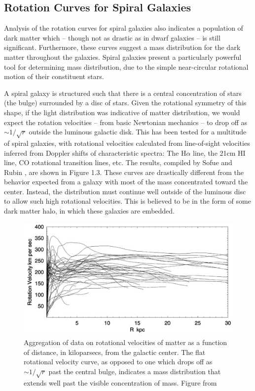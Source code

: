 \documentclass{report}
\begin{document}
\subsection{Rotation Curves for Spiral Galaxies}

Analysis of the rotation curves for spiral galaxies also indicates a population of dark matter which -- though not as drastic as in dwarf galaxies -- is still significant. Furthermore, these curves suggest a mass distribution for the dark matter throughout the galaxies. Spiral galaxies present a particularly powerful tool for determining mass distribution, due to the simple near-circular rotational motion of their constituent stars.

A spiral galaxy is structured such that there is a central concentration of stars (the bulge) surrounded by a disc of stars. Given the rotational symmetry of this shape, if the light distribution was indicative of matter distribution, we would expect the rotation velocities -- from basic Newtonian mechanics -- to drop off as $\sim 1/\sqrt{r}$ outside the luminous galactic disk. This has been tested for a multitude of spiral galaxies, with rotational velocities calculated from line-of-sight velocities inferred from Doppler shifts of characteristic spectra: The H$\alpha$ line, the 21cm HI line, CO rotational transition lines, etc. The results, compiled by Sofue and Rubin \cite{Sofue2001}, are shown in Figure 1.3. These curves are drastically different from the behavior expected from a galaxy with most of the mass concentrated toward the center. Instead, the distribution must continue well outside of the luminous disc to allow such high rotational velocities. This is believed to be in the form of some dark matter halo, in which these galaxies are embedded.

\begin{figure}[h]
\centering
\includegraphics[width = .5\textwidth]{Rotational_velocities.png}
\caption{Aggregation of data on rotational velocities of matter as a function of distance, in kiloparsecs, from the galactic center. The flat rotational velocity curve, as opposed to one which drops off as $\sim 1/\sqrt{r}$ past the central bulge, indicates a mass distribution that extends well past the visible concentration of mass. Figure from \cite{Sofue2001}}
\end{figure}
\end{document}
